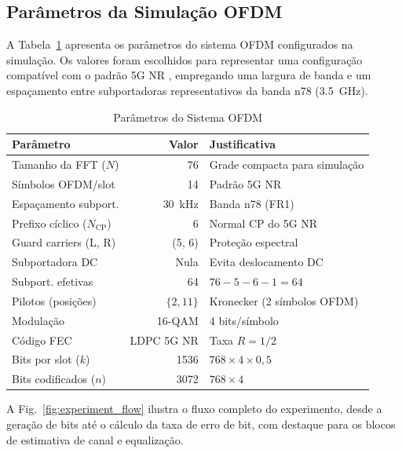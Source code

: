 \documentclass[conference]{IEEEtran}
\begin{document}
\subsection{Parâmetros da Simulação OFDM}

A Tabela~\ref{tab:params_ofdm} apresenta os parâmetros do sistema OFDM configurados na simulação. Os valores foram escolhidos para representar uma configuração compatível com o padrão 5G NR \cite{3gpp38211}, empregando uma largura de banda e um espaçamento entre subportadoras representativos da banda n78 (3.5~GHz).

\begin{table}[htbp]
\centering
\caption{Parâmetros do Sistema OFDM}
\label{tab:params_ofdm}
\begin{tabular}{@{}lrl@{}}
\toprule
\textbf{Parâmetro} & \textbf{Valor} & \textbf{Justificativa} \\
\midrule
Tamanho da FFT ($N$) & 76 & Grade compacta para simulação \\
Símbolos OFDM/slot & 14 & Padrão 5G NR \\
Espaçamento subport. & 30~kHz & Banda n78 (FR1) \\
Prefixo cíclico ($N_{\text{CP}}$) & 6 & Normal CP do 5G NR \\
Guard carriers (L, R) & (5, 6) & Proteção espectral \\
Subportadora DC & Nula & Evita deslocamento DC \\
Subport. efetivas & 64 & $76 - 5 - 6 - 1 = 64$ \\
Pilotos (posições) & $\{2, 11\}$ & Kronecker (2 símbolos OFDM) \\
Modulação & 16-QAM & 4 bits/símbolo \\
Código FEC & LDPC 5G NR & Taxa $R = 1/2$ \\
Bits por slot ($k$) & 1536 & $768 \times 4 \times 0{,}5$ \\
Bits codificados ($n$) & 3072 & $768 \times 4$ \\
\bottomrule
\end{tabular}
\end{table}

A Fig.~\ref{fig:experiment_flow} ilustra o fluxo completo do experimento, desde a geração de bits até o cálculo da taxa de erro de bit, com destaque para os blocos de estimativa de canal e equalização.
\end{document}
